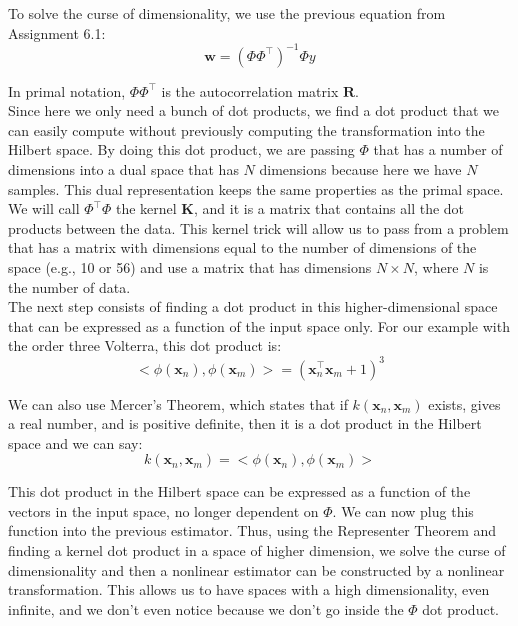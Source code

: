 \documentclass[11pt]{article}
\begin{document}
\begin{tcolorbox}[colback=CrispBlue!5!white,colframe=CrispBlue!75!black,title=Dual formulation of a non-linear classifier and the polynomial kernel.]

    To solve the curse of dimensionality, we use the previous equation from Assignment 6.1:
    \begin{equation}
        \mathbf{w} = (\Phi \Phi ^\top)^{-1} \Phi y
    \end{equation}
    
    In primal notation, \(\Phi \Phi ^\top\) is the autocorrelation matrix \(\mathbf{R}\).\\

    Since here we only need a bunch of dot products, we find a dot product that we can easily compute without previously computing the transformation into the Hilbert space. By doing this dot product, we are passing \(\Phi\) that has a number of dimensions into a dual space that has \(N\) dimensions because here we have \(N\) samples. This dual representation keeps the same properties as the primal space.\\

    We will call \(\Phi ^\top \Phi\) the kernel \(\mathbf{K}\), and it is a matrix that contains all the dot products between the data. This kernel trick will allow us to pass from a problem that has a matrix with dimensions equal to the number of dimensions of the space (e.g., 10 or 56) and use a matrix that has dimensions \(N \times N\), where \(N\) is the number of data.\\

    The next step consists of finding a dot product in this higher-dimensional space that can be expressed as a function of the input space only. For our example with the order three Volterra, this dot product is:
    \begin{equation}
        <\phi (\mathbf{x}_n), \phi (\mathbf{x}_m)> = (\mathbf{x}_n^\top \mathbf{x}_m + 1)^3
    \end{equation}

    We can also use Mercer's Theorem, which states that if \(k (\mathbf{x}_n, \mathbf{x}_m)\) exists, gives a real number, and is positive definite, then it is a dot product in the Hilbert space and we can say:
    \begin{equation}
        k (\mathbf{x}_n, \mathbf{x}_m) = <\phi (\mathbf{x}_n), \phi (\mathbf{x}_m)>
    \end{equation}
    
    This dot product in the Hilbert space can be expressed as a function of the vectors in the input space, no longer dependent on \(\Phi\). We can now plug this function into the previous estimator. Thus, using the Representer Theorem and finding a kernel dot product in a space of higher dimension, we solve the curse of dimensionality and then a nonlinear estimator can be constructed by a nonlinear transformation. This allows us to have spaces with a high dimensionality, even infinite, and we don't even notice because we don't go inside the \(\Phi\) dot product.
\end{tcolorbox}
\end{document}
